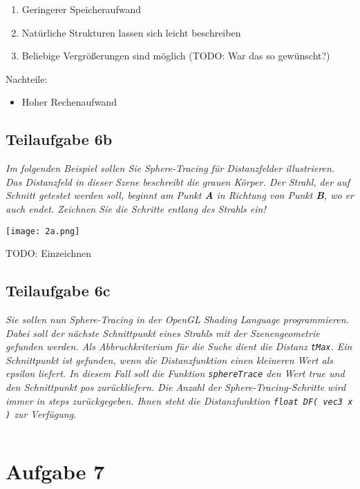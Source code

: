 \documentclass[a4paper]{scrartcl}
\begin{document}
\begin{enumerate}[label=(\arabic*)]
    \item Geringerer Speicheraufwand
    \item Natürliche Strukturen lassen sich leicht beschreiben
    \item Beliebige Vergrößerungen sind möglich (TODO: War das so gewünscht?)
\end{enumerate}

Nachteile:

\begin{itemize}
    \item Hoher Rechenaufwand
\end{itemize}

\clearpage
\subsection*{Teilaufgabe 6b}
\textit{Im folgenden Beispiel sollen Sie Sphere-Tracing für Distanzfelder
illustrieren. Das Distanzfeld in dieser Szene beschreibt die grauen Körper. Der
Strahl, der auf Schnitt getestet werden soll, beginnt am Punkt \textbf{A} in
Richtung von Punkt \textbf{B}, wo er auch endet. Zeichnen Sie die Schritte
entlang des Strahls ein!}

\texttt{[image: 2a.png]}

TODO: Einzeichnen

\clearpage
\subsection*{Teilaufgabe 6c}
\textit{Sie sollen nun Sphere-Tracing in der OpenGL Shading Language
programmieren. Dabei soll der nächste Schnittpunkt eines Strahls mit der
Szenengeometrie gefunden werden. Als Abbruchkriterium für die Suche dient die
Distanz \texttt{tMax}. Ein Schnittpunkt ist gefunden, wenn die Distanzfunktion
einen kleineren Wert als epsilon liefert. In diesem Fall soll die Funktion
\texttt{sphereTrace} den Wert true und den Schnittpunkt pos zurückliefern. Die
Anzahl der Sphere-Tracing-Schritte wird immer in steps zurückgegeben. Ihnen
steht die Distanzfunktion \texttt{float DF( vec3 x )} zur Verfügung.}

\inputminted[linenos, numbersep=5pt, tabsize=4, frame=lines, label=spheretracing.frag]{glsl}{spheretracing.frag}

\clearpage
\section*{Aufgabe 7}
\end{document}
